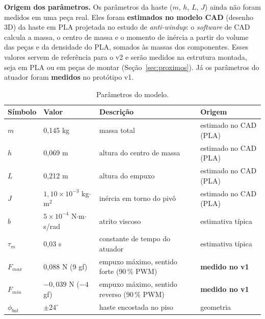 \documentclass[a4paper,11pt]{article}
\begin{document}
\textbf{Origem dos parâmetros.} Os parâmetros da haste ($m$, $h$, $L$, $J$) ainda não foram medidos
em uma peça real. Eles foram \textbf{estimados no modelo CAD} (desenho 3D) da haste em PLA projetada
no estudo de \textit{anti-windup}: o \textit{software} de CAD calcula a massa, o centro de massa e o
momento de inércia a partir do volume das peças e da densidade do PLA, somados às massas dos
componentes. Esses valores servem de referência para o v2 e serão medidos na estrutura montada, seja
em PLA ou em peças de montar (Seção~\ref{sec:proximos}). Já os parâmetros do atuador foram \textbf{medidos} no protótipo v1.

\begin{table}[H]
\centering\small
\caption{Parâmetros do modelo.}
\label{tab:param}
\begin{tabular}{@{}llll@{}}
\toprule
\textbf{Símbolo} & \textbf{Valor} & \textbf{Descrição} & \textbf{Origem} \\
\midrule
$m$ & 0,145 kg & massa total & estimado no CAD (PLA) \\
$h$ & 0,069 m & altura do centro de massa & estimado no CAD (PLA) \\
$L$ & 0,212 m & altura do empuxo & estimado no CAD (PLA) \\
$J$ & $1{,}10\times10^{-3}$ kg$\cdot$m$^2$ & inércia em torno do pivô & estimado no CAD (PLA) \\
$b$ & $5\times10^{-4}$ N$\cdot$m$\cdot$s/rad & atrito viscoso & estimativa típica \\
$\tau_m$ & 0,03 s & constante de tempo do atuador & estimativa típica \\
$F_{max}$ & 0,088 N (9 gf) & empuxo máximo, sentido forte (90\,\% PWM) & \textbf{medido no v1} \\
$F_{min}$ & $-0{,}039$ N ($-4$ gf) & empuxo máximo, sentido reverso (90\,\% PWM) & \textbf{medido no v1} \\
$\phi_{bat}$ & $\pm 24^\circ$ & haste encostada no piso & geometria \\
\bottomrule
\end{tabular}
\end{table}
\end{document}
